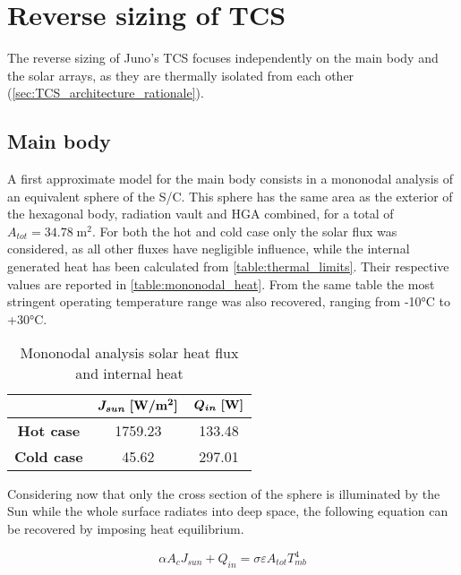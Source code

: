 \pagebreak
\section{Reverse sizing of TCS}
\label{sec:TCS_sizing}

The reverse sizing of Juno's TCS focuses independently on the main body and the solar arrays, as they are thermally isolated from each other (\autoref{sec:TCS_architecture_rationale}). 

\subsection{Main body}
\label{subsec:mb_mono_sizing}

A first approximate model for the main body consists in a mononodal analysis of an equivalent sphere of the S/C. This sphere has the same area as the exterior of the hexagonal body, radiation vault and HGA combined, for a total of $A_{tot} = 34.78 \; \textrm{m}^2$. For both the hot and cold case only the solar flux was considered, as all other fluxes have negligible influence, while the internal generated heat has been calculated from \autoref{table:thermal_limits}. Their respective values are reported in \autoref{table:mononodal_heat}. From the same table the most stringent operating temperature range was also recovered, ranging from -10°C to +30°C. 
\begin{table}[H]
    \renewcommand{\arraystretch}{1.3}
    \centering
    \begin{tabular}{|c|c|c|}
        \hline
        & $\boldsymbol{J_{sun} \; [\textrm{\textbf{W}}/\textrm{\textbf{m}}^2]}$ & $\boldsymbol{Q_{in} \; [\textrm{\textbf{W}}]}$ \\
        \hline
        \hline
        \textbf{Hot case} & 1759.23 & 133.48 \\
        \hline
        \textbf{Cold case} & 45.62 & 297.01 \\ 
        \hline
    \end{tabular}
    \caption{Mononodal analysis solar heat flux and internal heat}
    \label{table:mononodal_heat}
\end{table}

Considering now that only the cross section of the sphere is illuminated by the Sun while the whole surface radiates into deep space, the following equation can be recovered by imposing heat equilibrium.

\begin{equation}
    \alpha A_c J_{sun} + Q_{in} = \sigma \varepsilon A_{tot} T_{mb}^4
    \label{eq:heat_equlibrium}
\end{equation}  

